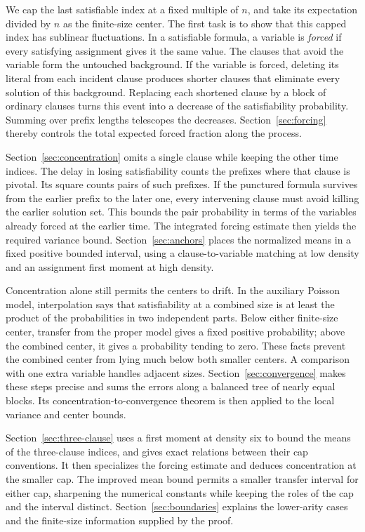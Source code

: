 We cap the last satisfiable index at a fixed multiple of \(n\), and
take its expectation divided by \(n\) as the finite-size center. The
first task is to show that this capped index has sublinear fluctuations.
In a satisfiable formula, a variable is \emph{forced} if every
satisfying assignment gives it the same value. The clauses that avoid
the variable form the untouched background. If the variable is forced,
deleting its literal from each incident clause produces shorter clauses
that eliminate every solution of this background. Replacing each
shortened clause by a block of ordinary clauses turns this event into
a decrease of the satisfiability probability. Summing over prefix
lengths telescopes the decreases. Section~\ref{sec:forcing} thereby
controls the total expected forced fraction along the process.

Section~\ref{sec:concentration} omits a single clause while keeping the
other time indices. The delay in losing satisfiability counts the
prefixes where that clause is pivotal. Its square counts pairs of such
prefixes. If the punctured formula survives from the earlier prefix to
the later one, every intervening clause must avoid killing the earlier
solution set. This bounds the pair probability in terms of the variables
already forced at the earlier time. The integrated forcing estimate
then yields the required variance bound. Section~\ref{sec:anchors}
places the normalized means in a fixed positive bounded interval, using
a clause-to-variable matching at low density and an assignment first
moment at high density.

Concentration alone still permits the centers to drift. In the auxiliary
Poisson model, interpolation says that satisfiability at a combined size
is at least the product of the probabilities in two independent parts.
Below either finite-size center, transfer from the proper model gives a
fixed positive probability; above the combined center, it gives a
probability tending to zero. These facts prevent the combined center
from lying much below both smaller centers. A comparison with one extra
variable handles adjacent sizes. Section~\ref{sec:convergence} makes
these steps precise and sums the errors along a balanced tree of nearly
equal blocks. Its concentration-to-convergence theorem is then applied
to the local variance and center bounds.

Section~\ref{sec:three-clause} uses a first moment at density six to
bound the means of the three-clause indices, and gives exact relations
between their cap conventions. It then specializes the forcing estimate and deduces
concentration at the smaller cap. The improved mean bound permits a
smaller transfer interval for either cap, sharpening the numerical
constants while keeping the roles of the cap and the interval distinct.
Section~\ref{sec:boundaries} explains the lower-arity cases and the
finite-size information supplied by the proof.
